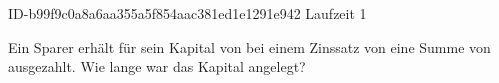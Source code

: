 \begin{exercise}
      {ID-b99f9c0a8a6aa355a5f854aac381ed1e1291e942}
      {Laufzeit 1}
  \ifproblem\problem\par
    Ein Sparer erhält für sein Kapital von  bei einem Zinssatz
    von  eine Summe von  ausgezahlt. Wie lange war das
    Kapital angelegt?
  \fi
\end{exercise}
